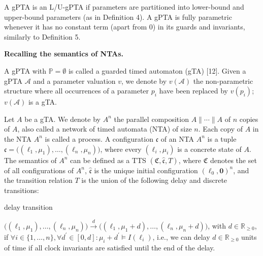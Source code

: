 \documentclass[10pt,a4paper]{article}
\begin{document}
 
 
 
A gPTA is an L/U-gPTA if parameters are partitioned into lower-bound and upper-bound parameters (as in Definition 4). A gPTA is fully parametric whenever it has no constant term (apart from 0) in its guards and invariants, similarly to Definition 5.\par
 
 
 
\par\medskip\noindent\textbf{Recalling the semantics of NTAs.}\par
 
 
A gPTA with $\mathbb{P}=\emptyset$ is called a guarded timed automaton (gTA) [12]. Given a gPTA $\mathcal{A}$ and a parameter valuation $v$, we denote by $v(\mathcal{A})$ the non-parametric structure where all occurrences of a parameter $p_{i}$ have been replaced by $v(p_{i})$; $v(\mathcal{A})$ is a gTA.\par
 
 
 
Let ${A}$ be a gTA. We denote by ${{A}}^{n}$ the parallel composition ${A}\parallel\cdots\parallel{A}$ of $n$ copies of ${A}$, also called a network of timed automata (NTA) of size $n$. Each copy of ${A}$ in the NTA ${{A}}^{n}$ is called a process. A configuration $\mathfrak{c}$ of an NTA ${{A}}^{n}$ is a tuple $\mathfrak{c}=\big((\mathrm{\ell}_{1},\mu_{1}),\ldots,(\mathrm{\ell}_{n},\mu_{n})\big)$, where every $(\mathrm{\ell}_{i},\mu_{i})$ is a concrete state of ${A}$. The semantics of ${{A}}^{n}$ can be defined as a TTS $(\mathfrak{C},\hat{\mathfrak{c}},T)$, where $\mathfrak{C}$ denotes the set of all configurations of ${{A}}^{n}$, $\hat{\mathfrak{c}}$ is the unique initial configuration $(\mathrm{\mathrm{\ell}_{0}},\mathbf{0})^{n}$, and the transition relation $T$ is the union of the following delay and discrete transitions:\par
  delay transition  
 
${\big((\mathrm{\ell}_{1},\mu_{1}),\ldots,(\mathrm{\ell}_{n},\mu_{n})\big)}\xrightarrow{d}{\big((\mathrm{\ell}_{1},\mu_{1}+d),\ldots,(\mathrm{\ell}_{n},\mu_{n}+d)\big)}$, with $d\in\mathbb{R}_{\geq 0}$, if $\forall i\in\{1,\dots,n\},\forall d^{\prime}\in[0,d]:\mu_{i}+d^{\prime}\models
I(\mathrm{\ell}_{i})$, i.e., we can delay $d\in\mathbb{R}_{\geq 0}$ units of time if all clock invariants are satisfied until the end of the delay.\par
 
\end{document}
